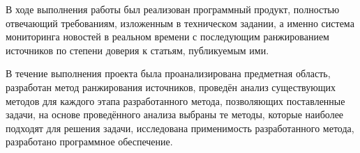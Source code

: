 \Conclusion

В ходе выполнения работы был реализован программный продукт, полностью отвечающий требованиям, изложенным в техническом задании, а именно система мониторинга новостей в реальном времени с последующим ранжированием источников по степени доверия к статьям, публикуемым ими.

В течение выполнения проекта была проанализирована предметная область, разработан метод ранжирования источников, проведён анализ существующих методов для каждого этапа разработанного метода, позволяющих поставленные задачи, на основе проведённого анализа выбраны те методы, которые наиболее подходят для решения задачи, исследована применимость разработанного метода, разработано программное обеспечение.
